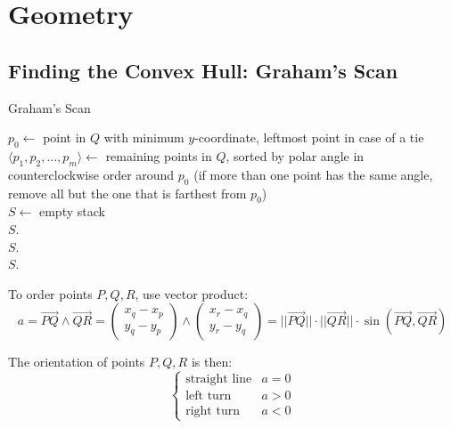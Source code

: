 \documentclass[a4paper, 12pt]{article}
\begin{document}
\section{Geometry}

  \subsection{Finding the Convex Hull: Graham's Scan}

\IncMargin{2em}
\begin{algorithm}[H]
\caption{Graham's Scan}
\vspace{0.1cm}
\Indm
{}
\Indp
\vspace{0.1cm}
$p_0 \gets$ point in $Q$ with minimum $y$-coordinate, leftmost point in case of a tie\\
  $\langle p_1, p_2, ..., p_m\rangle\gets$ remaining points in $Q$, sorted by polar angle in counterclockwise order around $p_0$ (if more than one point has the same angle, remove all but the one that is farthest from $p_0$)\\
$S\gets$ empty stack\\
$S$.\\
$S$.\\
$S$.\\
\end{algorithm}
\DecMargin{2em}
\vspace{0.5cm}

To order points $P, Q, R$, use vector product: $$a = \overrightarrow{PQ}\wedge\overrightarrow{QR} = \left(\begin{array}{c}x_q - x_p\\y_q - y_p\end{array}\right)\wedge\left(\begin{array}{c}x_r - x_q\\y_r - y_q\end{array}\right) = ||\overrightarrow{PQ}||\cdot||\overrightarrow{QR}||\cdot\sin(\overrightarrow{PQ}, \overrightarrow{QR})$$

The orientation of points $P, Q, R$ is then:
$$\left\{\begin{array}{ll}\text{straight line} & a = 0\\ \text{left turn} & a > 0\\ \text{right turn} & a < 0\end{array}\right.$$
\end{document}

